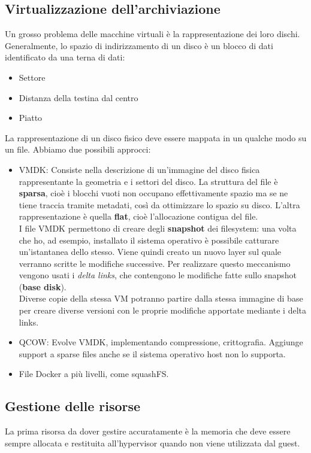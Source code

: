 \documentclass{article}
\begin{document}
		\subsection{Virtualizzazione dell'archiviazione}
		Un grosso problema delle macchine virtuali è la rappresentazione dei loro dischi.
		Generalmente, lo spazio di indirizzamento di un disco è un blocco di dati identificato
		da una terna di dati: 
		\begin{itemize}
			\item Settore
			\item Distanza della testina dal centro
			\item Piatto
		\end{itemize}
		La rappresentazione di un disco fisico deve essere mappata in un qualche modo su un file. Abbiamo due possibili approcci:
		\begin{itemize}
		    \item VMDK: Consiste nella descrizione di un'immagine del disco fisica rappresentante la geometria e i settori del disco. La struttura del file è \textbf{sparsa}, cioè i blocchi vuoti non occupano effettivamente spazio ma se ne tiene traccia tramite metadati, così da ottimizzare lo spazio su disco. L'altra rappresentazione è quella \textbf{flat}, cioè l'allocazione contigua del file.\\ 
		    
		    I file VMDK permettono di creare degli \textbf{snapshot} dei filesystem: una volta che ho, ad
		    esempio, installato il sistema operativo è possibile catturare un'istantanea dello stesso.
		    Viene quindi creato un nuovo layer sul quale verranno scritte le modifiche successive. Per realizzare questo meccanismo vengono usati i
		    \textit{delta links}, che contengono le modifiche fatte sullo snapshot (\textbf{base disk}).\\
		    Diverse copie della stessa VM potranno partire dalla stessa immagine di base per creare diverse versioni con le proprie modifiche apportate mediante i delta links.
		    \item QCOW: Evolve VMDK, implementando compressione, crittografia. Aggiunge support a sparse files anche se il sistema operativo host non lo supporta.
		    \item File Docker a più livelli, come squashFS.
		\end{itemize}
		
		\subsection{Gestione delle risorse}
		La prima risorsa da dover gestire accuratamente è la memoria che deve essere sempre allocata e restituita all'hypervisor quando non viene utilizzata dal guest.\\
		
\end{document}
